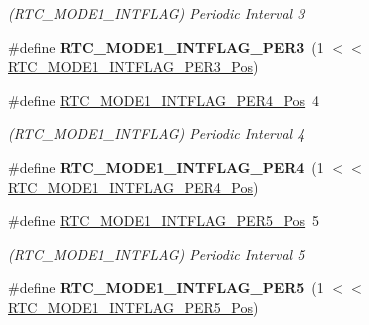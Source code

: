 \begin{DoxyCompactItemize}
\begin{DoxyCompactList}\small\item\em (R\+T\+C\+\_\+\+M\+O\+D\+E1\+\_\+\+I\+N\+T\+F\+L\+A\+G) Periodic Interval 3 \end{DoxyCompactList}\item 
\hypertarget{group___s_a_m_l21___r_t_c_gaba5c42982eced1b98fd12a50e0d3e135}{}\#define {\bfseries R\+T\+C\+\_\+\+M\+O\+D\+E1\+\_\+\+I\+N\+T\+F\+L\+A\+G\+\_\+\+P\+E\+R3}~(1 $<$$<$ \hyperlink{group___s_a_m_l21___r_t_c_ga89128f57810868cd724b8d2ed74d6b7f}{R\+T\+C\+\_\+\+M\+O\+D\+E1\+\_\+\+I\+N\+T\+F\+L\+A\+G\+\_\+\+P\+E\+R3\+\_\+\+Pos})\label{group___s_a_m_l21___r_t_c_gaba5c42982eced1b98fd12a50e0d3e135}

\item 
\hypertarget{group___s_a_m_l21___r_t_c_gaa0c6c7a1b2533763cc68335653ff5227}{}\#define \hyperlink{group___s_a_m_l21___r_t_c_gaa0c6c7a1b2533763cc68335653ff5227}{R\+T\+C\+\_\+\+M\+O\+D\+E1\+\_\+\+I\+N\+T\+F\+L\+A\+G\+\_\+\+P\+E\+R4\+\_\+\+Pos}~4\label{group___s_a_m_l21___r_t_c_gaa0c6c7a1b2533763cc68335653ff5227}

\begin{DoxyCompactList}\small\item\em (R\+T\+C\+\_\+\+M\+O\+D\+E1\+\_\+\+I\+N\+T\+F\+L\+A\+G) Periodic Interval 4 \end{DoxyCompactList}\item 
\hypertarget{group___s_a_m_l21___r_t_c_gae4a382be66c91fade2338d04a1918d83}{}\#define {\bfseries R\+T\+C\+\_\+\+M\+O\+D\+E1\+\_\+\+I\+N\+T\+F\+L\+A\+G\+\_\+\+P\+E\+R4}~(1 $<$$<$ \hyperlink{group___s_a_m_l21___r_t_c_gaa0c6c7a1b2533763cc68335653ff5227}{R\+T\+C\+\_\+\+M\+O\+D\+E1\+\_\+\+I\+N\+T\+F\+L\+A\+G\+\_\+\+P\+E\+R4\+\_\+\+Pos})\label{group___s_a_m_l21___r_t_c_gae4a382be66c91fade2338d04a1918d83}

\item 
\hypertarget{group___s_a_m_l21___r_t_c_ga8094e8c322c3e22c4d7ad76a16cbdbf5}{}\#define \hyperlink{group___s_a_m_l21___r_t_c_ga8094e8c322c3e22c4d7ad76a16cbdbf5}{R\+T\+C\+\_\+\+M\+O\+D\+E1\+\_\+\+I\+N\+T\+F\+L\+A\+G\+\_\+\+P\+E\+R5\+\_\+\+Pos}~5\label{group___s_a_m_l21___r_t_c_ga8094e8c322c3e22c4d7ad76a16cbdbf5}

\begin{DoxyCompactList}\small\item\em (R\+T\+C\+\_\+\+M\+O\+D\+E1\+\_\+\+I\+N\+T\+F\+L\+A\+G) Periodic Interval 5 \end{DoxyCompactList}\item 
\hypertarget{group___s_a_m_l21___r_t_c_gac9d32e4368f642707e6fb8acf924a0b4}{}\#define {\bfseries R\+T\+C\+\_\+\+M\+O\+D\+E1\+\_\+\+I\+N\+T\+F\+L\+A\+G\+\_\+\+P\+E\+R5}~(1 $<$$<$ \hyperlink{group___s_a_m_l21___r_t_c_ga8094e8c322c3e22c4d7ad76a16cbdbf5}{R\+T\+C\+\_\+\+M\+O\+D\+E1\+\_\+\+I\+N\+T\+F\+L\+A\+G\+\_\+\+P\+E\+R5\+\_\+\+Pos})\label{group___s_a_m_l21___r_t_c_gac9d32e4368f642707e6fb8acf924a0b4}


\end{DoxyCompactItemize}
